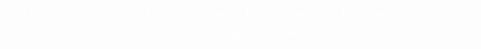 \textcolor{white}{\gls{analytic_func}, \gls{rational_func}, \gls{proper_func}, \gls{injective_func}, \gls{surjective_func}, \gls{bijective_func}, \gls{lipschitz}, \gls{compact_space}, \gls{hurwitz}}